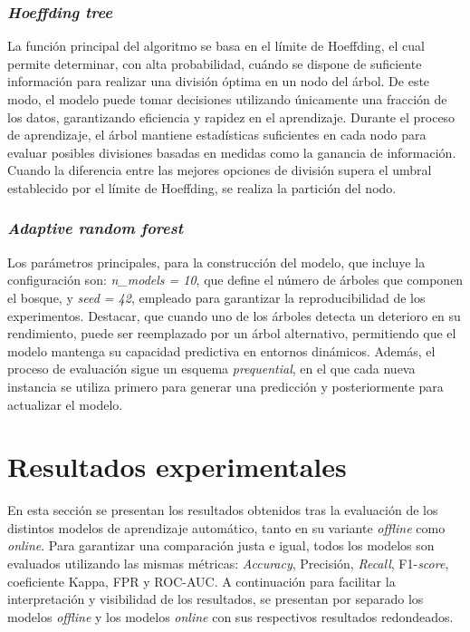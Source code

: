 \documentclass[12pt,a4paper]{report}
\begin{document}
\subsubsection{\emph{Hoeffding tree}}

La función principal del algoritmo se basa en el límite de Hoeffding, el cual permite determinar, con alta probabilidad, cuándo se dispone de suficiente información para realizar una división óptima en un nodo del árbol. De este modo, el modelo puede tomar decisiones utilizando únicamente una fracción de los datos, garantizando eficiencia y rapidez en el aprendizaje. Durante el proceso de aprendizaje, el árbol mantiene estadísticas suficientes en cada nodo para evaluar posibles divisiones basadas en medidas como la ganancia de información. Cuando la diferencia entre las mejores opciones de división supera el umbral establecido por el límite de Hoeffding, se realiza la partición del nodo.


\subsubsection{\emph{Adaptive random forest}}

Los parámetros principales, para la construcción del modelo, que incluye la configuración son: \emph{n\_models = 10}, que define el número de árboles que componen el bosque, y \emph{seed = 42}, empleado para garantizar la reproducibilidad de los experimentos. Destacar, que cuando uno de los árboles detecta un deterioro en su rendimiento, puede ser reemplazado por un árbol alternativo, permitiendo que el modelo mantenga su capacidad predictiva en entornos dinámicos. Además, el proceso de evaluación sigue un esquema  \emph{prequential}, en el que cada nueva instancia se utiliza primero para generar una predicción y posteriormente para actualizar el modelo.


\section{Resultados experimentales}

En esta sección se presentan los resultados obtenidos tras la evaluación de los distintos modelos de aprendizaje automático, tanto en su variante \emph{offline} como \emph{online}. Para garantizar una comparación justa e igual, todos los modelos son evaluados utilizando las mismas métricas: \emph{Accuracy}, Precisión, \emph{Recall}, F1-\emph{score}, coeficiente Kappa, FPR y ROC-AUC. A continuación para facilitar la interpretación y visibilidad de los resultados, se presentan por separado los modelos \emph{offline} y los modelos \emph{online} con sus respectivos resultados redondeados.
\end{document}
